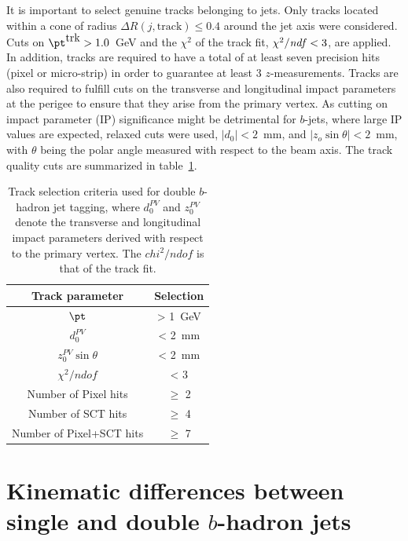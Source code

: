  It is important to select genuine tracks belonging to jets. Only tracks located  within a cone of radius $\Delta R(j,\mbox{track}) \leq 0.4$ around the jet axis were considered. %
  Cuts on $\pt^{\mbox{trk}}>1.0$~GeV and the $\chi^2$ of the track fit, $\chi^2/{\it ndf}<3$, are applied. %
 In addition, tracks are required to have a total of at least seven precision hits (pixel or micro-strip) in order to guarantee at least 3 $z$-measurements. Tracks are also required to fulfill cuts on the transverse and longitudinal impact parameters at the perigee to ensure that they arise from  the primary vertex. As cutting on impact parameter (IP) significance might be detrimental for $b$-jets, where large IP values are expected, relaxed cuts were used, $|d_{0}|<2$~mm, and $|z_{o}\sin\theta|<2$~mm, with $\theta$ being the polar angle measured with respect to the beam axis. The track quality cuts are summarized in table~\ref{tb:tracks}. %


\begin{table}[!hbt] %
\renewcommand{\arraystretch}{1.2}
\centering
\begin{tabular}{ c  c  }
  \hline
  Track parameter &  Selection \\ \hline
  $\pt$   &   > 1~GeV \\
  $d_0^{PV}$   &   < 2~mm \\
  $z_0^{PV}\sin \theta$   &   < 2~mm \\
  $\chi^2 /ndof$   &   < 3 \\
  Number of Pixel hits   &  $\geq$ 2 \\
  Number of SCT hits   &   $\geq$ 4 \\
  Number of Pixel+SCT hits   &  $\geq$ 7 \\ \hline
\end{tabular}
\caption{Track selection criteria used for double $b$-hadron jet tagging, where $d_0^{PV}$ and $z_0^{PV}$ denote the transverse and longitudinal impact parameters derived with respect to the primary vertex. The $chi^2 / ndof$ is that of the track fit.}
\label{tb:tracks}
\end{table}




\section{Kinematic differences between single and double $b$-hadron jets}\label{sec:gbbKine}

